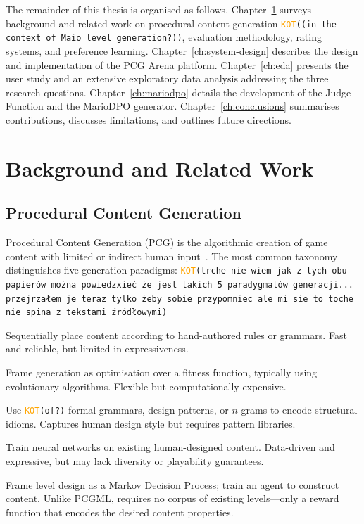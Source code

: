 \documentclass[shortabstract, mgr, english]{iithesis}
\newcommand{\DEBUG}[1]{{#1}} %
\newcommand{\KOT}[1]{\DEBUG{\tt{\textcolor{orange}{KOT}(}{#1}{)}}}
\begin{document}
The remainder of this thesis is organised as follows.
Chapter~\ref{ch:background} surveys background and related work on procedural
content generation \KOT{(in the context of Maio level generation?)}, evaluation methodology, rating systems, and preference
learning. Chapter~\ref{ch:system-design} describes the design and implementation
of the PCG Arena platform. Chapter~\ref{ch:eda} presents the user study and an
extensive exploratory data analysis addressing the three research questions.
Chapter~\ref{ch:mariodpo} details the development of the Judge Function and the
MarioDPO generator. Chapter~\ref{ch:conclusions} summarises contributions,
discusses limitations, and outlines future directions.


\chapter{Background and Related Work}
\label{ch:background}

\section{Procedural Content Generation}
\label{sec:bg-pcg}

Procedural Content Generation (PCG) is the algorithmic creation of game content
with limited or indirect human input~\citep{togelius2011search}. The most common
taxonomy~\citep{togelius2011search, summerville2018pcgml} distinguishes five
generation paradigms:
\KOT{trche nie wiem jak z tych obu papierów można powiedzxieć że jest takich 5 paradygmatów generacji... przejrzałem je teraz tylko żeby sobie przypomniec ale mi sie to toche nie spina z tekstami źródłowymi}

\begin{description}[style=nextline, leftmargin=1.5em]
    \item[Constructive / Rule-based] Sequentially place content according to
    hand-authored rules or grammars. Fast and reliable, but limited in
    expressiveness.
    \item[Search-based (SBPCG)] Frame generation as optimisation over a fitness
    function, typically using evolutionary algorithms. Flexible but
    computationally expensive.
    \item[Grammar / Pattern-based] Use \KOT{of?} formal grammars, design patterns, or
    $n$-grams to encode structural idioms. Captures human design style but
    requires pattern libraries.
    \item[Machine Learning (PCGML)] Train neural networks on existing
    human-designed content. Data-driven and expressive, but may lack diversity
    or playability guarantees.
    \item[Reinforcement Learning (PCGRL)] Frame level design as a Markov
    Decision Process; train an agent to construct content. Unlike PCGML,
    requires no corpus of existing levels---only a reward function that
    encodes the desired content properties.
\end{description}
\end{document}
